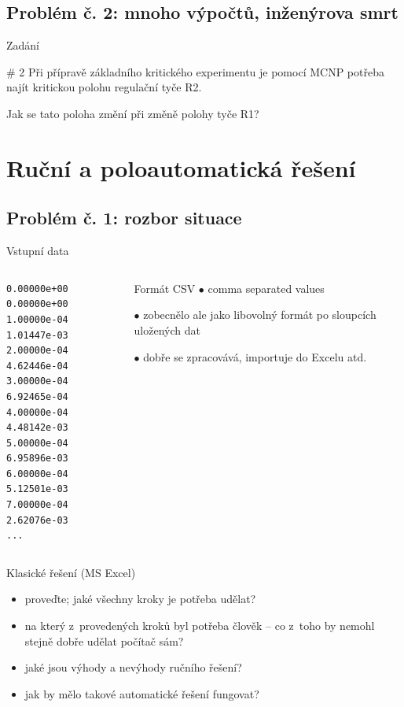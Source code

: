 \documentclass{beamer}
\begin{document}
\subsection{Problém č. 2: mnoho výpočtů, inženýrova smrt}

\begin{frame}{Zadání}
  \begin{block}{\# 2}
    Při přípravě základního kritického experimentu je pomocí MCNP potřeba najít kritickou polohu regulační tyče R2.

    Jak se tato poloha změní při změně polohy tyče R1?
  \end{block}
\end{frame}

\section{Ruční a poloautomatická řešení}

\subsection{Problém č. 1: rozbor situace}

\begin{frame}[fragile]{Vstupní data}
  \begin{columns}
      {\scriptsize
      \begin{verbatim}
0.00000e+00 0.00000e+00
1.00000e-04 1.01447e-03
2.00000e-04 4.62446e-04
3.00000e-04 6.92465e-04
4.00000e-04 4.48142e-03
5.00000e-04 6.95896e-03
6.00000e-04 5.12501e-03
7.00000e-04 2.62076e-03
...
      \end{verbatim}
      }
      \begin{block}{Formát CSV}
        $\bullet$ comma separated values

        $\bullet$ zobecnělo ale jako libovolný formát po sloupcích uložených dat

        $\bullet$ dobře se zpracovává, importuje do Excelu atd.
      \end{block}
  \end{columns}
\end{frame}

\begin{frame}{Klasické řešení (MS Excel)}
  \begin{itemize}
    \item proveďte; jaké všechny kroky je potřeba udělat?
    \item na který z~provedených kroků byl potřeba člověk -- co z~toho by nemohl stejně dobře udělat počítač sám?
    \item jaké jsou výhody a nevýhody ručního řešení?
    \item jak by mělo takové automatické řešení fungovat?
  \end{itemize}
\end{frame}
\end{document}
